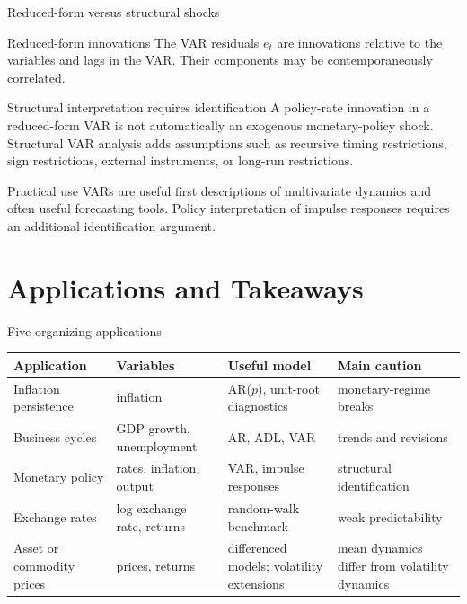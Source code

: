 \documentclass[10pt]{beamer}
\begin{document}
\begin{frame}{Reduced-form versus structural shocks}
\small
\begin{block}{Reduced-form innovations}
The VAR residuals $e_t$ are innovations relative to the variables and lags in the VAR. Their components may be contemporaneously correlated.
\end{block}

\pause
\begin{alertblock}{Structural interpretation requires identification}
A policy-rate innovation in a reduced-form VAR is not automatically an exogenous monetary-policy shock. Structural VAR analysis adds assumptions such as recursive timing restrictions, sign restrictions, external instruments, or long-run restrictions.
\end{alertblock}

\pause
\begin{exampleblock}{Practical use}
VARs are useful first descriptions of multivariate dynamics and often useful forecasting tools. Policy interpretation of impulse responses requires an additional identification argument.
\end{exampleblock}
\end{frame}

\section{Applications and Takeaways}

\begin{frame}{Five organizing applications}
\small
\begin{tabularx}{\textwidth}{p{}p{}p{}Y}
\toprule
Application & Variables & Useful model & Main caution \\
\midrule
Inflation persistence & inflation & AR($p$), unit-root diagnostics & monetary-regime breaks \\
Business cycles & GDP growth, unemployment & AR, ADL, VAR & trends and revisions \\
Monetary policy & rates, inflation, output & VAR, impulse responses & structural identification \\
Exchange rates & log exchange rate, returns & random-walk benchmark & weak predictability \\
Asset or commodity prices & prices, returns & differenced models; volatility extensions & mean dynamics differ from volatility dynamics \\
\bottomrule
\end{tabularx}
\end{frame}
\end{document}
